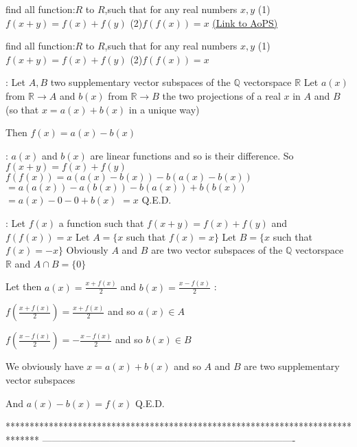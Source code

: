 \begin{problem}
	find all function:$R$ to $R$,such that for any real numbers $x,y$
(1)$f(x+y)=f(x)+f(y)$
(2)$f(f(x))=x$
	\flushright \href{https://artofproblemsolving.com/community/c6h463336}{(Link to AoPS)}
\end{problem}



\begin{solution}
	\begin{tcolorbox}find all function:$R$ to $R$,such that for any real numbers $x,y$
(1)$f(x+y)=f(x)+f(y)$
(2)$f(f(x))=x$\end{tcolorbox}
 :
Let $A,B$ two supplementary vector subspaces of the $\mathbb Q$ vectorspace $\mathbb R$
Let $a(x)$ from $\mathbb R\to A$ and $b(x)$ from $\mathbb R\to B$ the two projections of a real $x$ in $A$ and $B$ (so that $x=a(x)+b(x)$ in a unique way)

Then  $\boxed{f(x)=a(x)-b(x)}$

 :
$a(x)$ and $b(x)$ are linear functions and so is their difference. So $f(x+y)=f(x)+f(y)$
$f(f(x))=a(a(x)-b(x))-b(a(x)-b(x))$ $=a(a(x))-a(b(x))-b(a(x))+b(b(x))$ $=a(x)-0-0+b(x)$ $=x$
Q.E.D.

 :
Let $f(x)$ a function such that $f(x+y)=f(x)+f(y)$ and $f(f(x))=x$
Let $A=\{x$ such that $f(x)=x\}$
Let $B=\{x$ such that $f(x)=-x\}$
Obviously $A$ and $B$ are two vector subspaces of the $\mathbb Q$ vectorspace $\mathbb R$ and  $A\cap B=\{0\}$

Let then $a(x)=\frac{x+f(x)}2$ and $b(x)=\frac{x-f(x)}2$ :

$f\left(\frac{x+f(x)}2\right)=\frac{x+f(x)}2$ and so $a(x)\in A$

$f\left(\frac{x-f(x)}2\right)=-\frac{x-f(x)}2$ and so $b(x)\in B$

We obviously have $x=a(x)+b(x)$ and so $A$ and $B$ are two supplementary vector subspaces

And $a(x)-b(x)=f(x)$
Q.E.D.
\end{solution}
*******************************************************************************
-------------------------------------------------------------------------------

